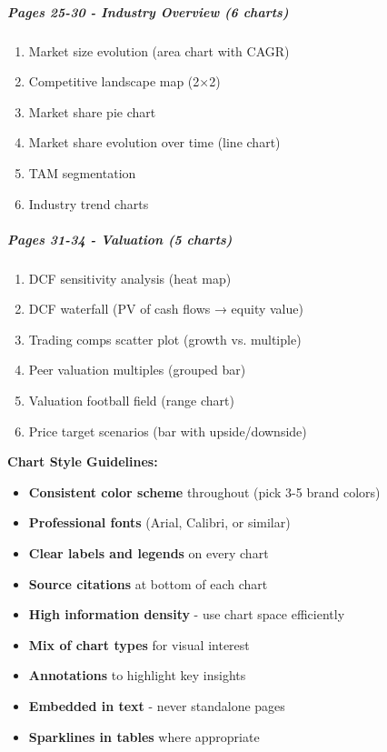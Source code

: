 \documentclass[11pt]{article}
\begin{document}
\subparagraph{Pages 25-30 - Industry Overview (6 charts)}\mbox{}\par
\begin{enumerate}[leftmargin=*,itemsep=2pt,topsep=2pt]
\item {} Market size evolution (area chart with CAGR)
\item {} Competitive landscape map (2×2)
\item {} Market share pie chart
\item {} Market share evolution over time (line chart)
\item {} TAM segmentation
\item {} Industry trend charts
\end{enumerate}

\subparagraph{Pages 31-34 - Valuation (5 charts)}\mbox{}\par
\begin{enumerate}[leftmargin=*,itemsep=2pt,topsep=2pt]
\item {} DCF sensitivity analysis (heat map)
\item {} DCF waterfall (PV of cash flows → equity value)
\item {} Trading comps scatter plot (growth vs. multiple)
\item {} Peer valuation multiples (grouped bar)
\item {} Valuation football field (range chart)
\item {} Price target scenarios (bar with upside/downside)
\end{enumerate}

\textbf{Chart Style Guidelines:}

\begin{itemize}[leftmargin=*,itemsep=2pt,topsep=2pt]
\item {} \textbf{Consistent color scheme} throughout (pick 3-5 brand colors)
\item {} \textbf{Professional fonts} (Arial, Calibri, or similar)
\item {} \textbf{Clear labels and legends} on every chart
\item {} \textbf{Source citations} at bottom of each chart
\item {} \textbf{High information density} - use chart space efficiently
\item {} \textbf{Mix of chart types} for visual interest
\item {} \textbf{Annotations} to highlight key insights
\item {} \textbf{Embedded in text} - never standalone pages
\item {} \textbf{Sparklines in tables} where appropriate
\end{itemize}
\end{document}
